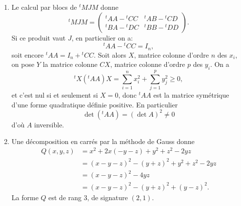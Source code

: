 \begin{enumerate}[label=\arabic*.,leftmargin=2.2em,itemsep=1.1em]
La parité, $(P(k),P(-k))$ peut jouer un rôle. Si $P$ est pair et $Q$ impair, $P(k)Q(-k)=-P(-k)Q(k)$ donc $\varphi(P,Q)=0$.

Soit donc $E=\mathbb R_n[X]$ et
\[
F=\operatorname{Vect}(1,x^2,x^4,\ldots,x^{2p},\ldots),\qquad 2p\le n
\]
et
\[
G=\operatorname{Vect}(x,x^3,\ldots,x^{2p+1},\ldots),\qquad 2p+1\le n.
\]
On a $E=F\oplus G$, avec $F\subset G^0$ et $G\subset F^0$, conjugués pour $\varphi$.

Sur $F$,
\[
\Phi(P)=\sum_{k\ge0}(P(k))^2e^{-k}\ge0,
\]
nul si et seulement si $P(k)=0$ pour tout $k$ de $\mathbb N$ donc si $P=0$; et sur $G$,
\[
\Phi(P)=-\sum_{k\ge0}(P(k))^2e^{-k}
\]
est de même définie négative. En décomposant en carrés les restrictions de $\Phi$ à $F$ et $G$ on en déduit donc que la signature de $\Phi$ est $(\dim F,\dim G)$ ou encore:
\[
\begin{array}{ll}
\text{si }n=2p,&\text{signature }(p+1,p),\\
\text{si }n=2p+1,&\text{signature }(p+1,p+1).
\end{array}
\]

\item Le calcul par blocs de ${}^tMJM$ donne
\[
{}^tMJM=
\begin{pmatrix}
{}^tAA-{}^tCC&{}^tAB-{}^tCD\\
{}^tBA-{}^tDC&{}^tBB-{}^tDD
\end{pmatrix}.
\]
Si ce produit vaut $J$, en particulier on a:
\[
{}^tAA-{}^tCC=I_n,
\]
soit encore ${}^tAA=I_n+{}^tCC$. Soit alors $X$, matrice colonne d'ordre $n$ des $x_i$, on pose $Y$ la matrice colonne $CX$, matrice colonne d'ordre $p$ des $y_i$. On a
\[
{}^tX({}^tAA)X=\sum_{i=1}^n x_i^2+\sum_{j=1}^p y_j^2\ge0,
\]
et c'est nul si et seulement si $X=0$, donc ${}^tAA$ est la matrice symétrique d'une forme quadratique définie positive. En particulier
\[
\det({}^tAA)=(\det A)^2\ne0
\]
d'où $A$ inversible.

\item Une décomposition en carrés par la méthode de Gauss donne
\begin{align*}
Q(x,y,z)&=x^2+2x(-y-z)+y^2+z^2-2yz\\
&=(x-y-z)^2-(y+z)^2+y^2+z^2-2yz\\
&=(x-y-z)^2-4yz\\
&=(x-y-z)^2-(y+z)^2+(y-z)^2.
\end{align*}
La forme $Q$ est de rang 3, de signature $(2,1)$.


\end{enumerate}
